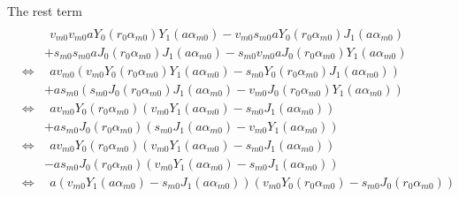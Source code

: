 \documentclass{article}
\begin{document}
The rest term
\begin{eqnarray}
\nonumber\\
    & & \ \ v_{m0}v_{m0} aY_0(r_0\alpha_{m0})Y_1(a\alpha_{m0})
        - v_{m0}s_{m0} aY_0(r_0\alpha_{m0})J_1(a\alpha_{m0})
\nonumber\\
    & & + s_{m0}s_{m0} aJ_0(r_0\alpha_{m0})J_1(a\alpha_{m0})
        - s_{m0}v_{m0} aJ_0(r_0\alpha_{m0})Y_1(a\alpha_{m0})
\nonumber\\
    &\Leftrightarrow& \ \ 
        av_{m0}(
          v_{m0} Y_0(r_0\alpha_{m0})Y_1(a\alpha_{m0})
        - s_{m0} Y_0(r_0\alpha_{m0})J_1(a\alpha_{m0}))
\nonumber\\
    & & + as_{m0}(
          s_{m0} J_0(r_0\alpha_{m0})J_1(a\alpha_{m0})
        - v_{m0} J_0(r_0\alpha_{m0})Y_1(a\alpha_{m0}))
\nonumber\\
    &\Leftrightarrow& \ \ 
        av_{m0}Y_0(r_0\alpha_{m0})
        (v_{m0} Y_1(a\alpha_{m0}) - s_{m0} J_1(a\alpha_{m0}))
\nonumber\\
    & & + as_{m0}J_0(r_0\alpha_{m0})
        (s_{m0} J_1(a\alpha_{m0}) - v_{m0} Y_1(a\alpha_{m0}))
\nonumber\\
    &\Leftrightarrow& \ \ 
        av_{m0}Y_0(r_0\alpha_{m0})
        (v_{m0} Y_1(a\alpha_{m0}) - s_{m0} J_1(a\alpha_{m0}))
\nonumber\\
    & & - as_{m0}J_0(r_0\alpha_{m0})
        (v_{m0} Y_1(a\alpha_{m0}) - s_{m0} J_1(a\alpha_{m0}))
\nonumber\\
    &\Leftrightarrow& \ \ 
        a
        (v_{m0} Y_1(a  \alpha_{m0}) - s_{m0} J_1(a\alpha_{m0}))
        (v_{m0} Y_0(r_0\alpha_{m0}) - s_{m0} J_0(r_0\alpha_{m0}))
\end{eqnarray}
\end{document}
